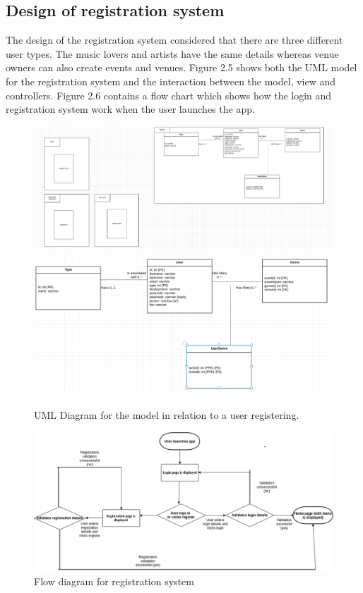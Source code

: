 \subsection{Design of registration system}
The design of the registration system considered that there are three different user types. The music lovers and artists have the same details whereas venue owners can also create events and venues. Figure 2.5 shows both the UML model for the registration system and the interaction between the model, view and controllers. Figure 2.6  contains a flow chart which shows how the login and registration system work when the user launches the app.
\begin{center}
\begin{figure}[H]
\includegraphics[width=\textwidth,height=\textheight,keepaspectratio]{images/register}
\includegraphics[width=\textwidth,height=\textheight,keepaspectratio]{images/users}
\caption{UML Diagram for the model in relation to a user registering.}
\end{figure}
\end{center}
\begin{center}
\begin{figure}[H]
\includegraphics[width=\textwidth,height=\textheight,keepaspectratio]{images/flow}
\caption{Flow diagram for registration system}
\end{figure}
\end{center}



